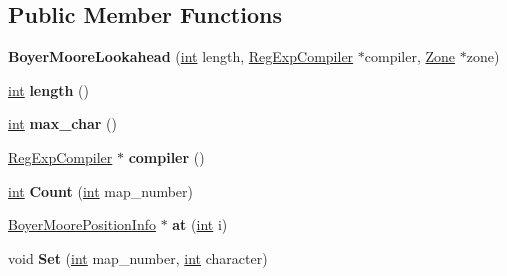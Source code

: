 \subsection*{Public Member Functions}
\begin{DoxyCompactItemize}
\item 
\mbox{\label{classv8_1_1internal_1_1BoyerMooreLookahead_ab6a48b1e2e6882f08b2b6675ff8df09c}} 
{\bfseries Boyer\+Moore\+Lookahead} (\mbox{\hyperlink{classint}{int}} length, \mbox{\hyperlink{classv8_1_1internal_1_1RegExpCompiler}{Reg\+Exp\+Compiler}} $\ast$compiler, \mbox{\hyperlink{classv8_1_1internal_1_1Zone}{Zone}} $\ast$zone)
\item 
\mbox{\label{classv8_1_1internal_1_1BoyerMooreLookahead_adf8931d50830d985a1423b6b1b8612db}} 
\mbox{\hyperlink{classint}{int}} {\bfseries length} ()
\item 
\mbox{\label{classv8_1_1internal_1_1BoyerMooreLookahead_aa29b6ac73eb53c5bfce5be63b0a7ebd5}} 
\mbox{\hyperlink{classint}{int}} {\bfseries max\+\_\+char} ()
\item 
\mbox{\label{classv8_1_1internal_1_1BoyerMooreLookahead_aa9e74726e490b7e55d846bfbf9117b74}} 
\mbox{\hyperlink{classv8_1_1internal_1_1RegExpCompiler}{Reg\+Exp\+Compiler}} $\ast$ {\bfseries compiler} ()
\item 
\mbox{\label{classv8_1_1internal_1_1BoyerMooreLookahead_a59acc100fba6e91982d56037e23430a2}} 
\mbox{\hyperlink{classint}{int}} {\bfseries Count} (\mbox{\hyperlink{classint}{int}} map\+\_\+number)
\item 
\mbox{\label{classv8_1_1internal_1_1BoyerMooreLookahead_a966ed7328590844feb533c01078ad12f}} 
\mbox{\hyperlink{classv8_1_1internal_1_1BoyerMoorePositionInfo}{Boyer\+Moore\+Position\+Info}} $\ast$ {\bfseries at} (\mbox{\hyperlink{classint}{int}} i)
\item 
\mbox{\label{classv8_1_1internal_1_1BoyerMooreLookahead_af4c7e21eb752bb01e83017365c1f9df0}} 
void {\bfseries Set} (\mbox{\hyperlink{classint}{int}} map\+\_\+number, \mbox{\hyperlink{classint}{int}} character)

\end{DoxyCompactItemize}
